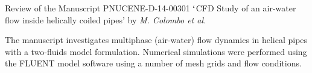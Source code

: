 \documentclass[14pt,twoside]{report}
\begin{document}
{{{%
\afterpage{%
    \clearpage%
    \thispagestyle{empty}%
    \begin{landscape}%
        \centering %
        \vfill
    \end{landscape}
    \clearpage%
}
\vfill
\clearpage



\begin{center}
{\Large Review of the Manuscript PNUCENE-D-14-00301 $\lq$CFD Study of an air-water flow inside helically coiled pipes' by {\it M. Colombo et al.}}
\end{center}

\medskip

The manuscript investigates multiphase (air-water) flow dynamics in helical pipes with a two-fluids model formulation.  Numerical simulations were performed using the FLUENT model software using a number of mesh grids and flow conditions. 

}}}
\end{document}
